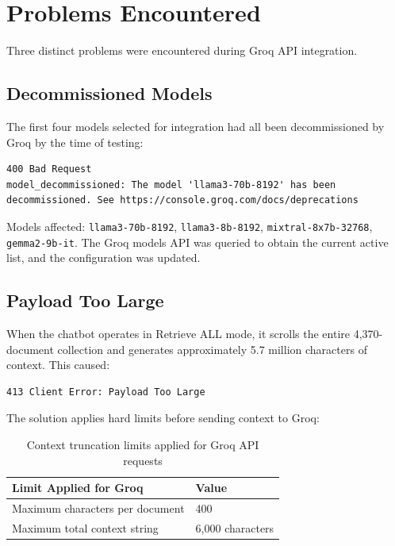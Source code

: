 \documentclass[12pt,a4paper]{report}
\begin{document}
\section{Problems Encountered}

Three distinct problems were encountered during Groq API integration.

\subsection{Decommissioned Models}

The first four models selected for integration had all been decommissioned by Groq by the time of testing:

\begin{lstlisting}[style=bashstyle]
400 Bad Request
model_decommissioned: The model 'llama3-70b-8192' has been
decommissioned. See https://console.groq.com/docs/deprecations
\end{lstlisting}

Models affected: \texttt{llama3-70b-8192}, \texttt{llama3-8b-8192}, \texttt{mixtral-8x7b-32768}, \texttt{gemma2-9b-it}. The Groq models API was queried to obtain the current active list, and the configuration was updated.

\subsection{Payload Too Large}

When the chatbot operates in Retrieve ALL mode, it scrolls the entire 4,370-document collection and generates approximately 5.7 million characters of context. This caused:

\begin{lstlisting}[style=bashstyle]
413 Client Error: Payload Too Large
\end{lstlisting}

The solution applies hard limits before sending context to Groq:

\begin{table}[H]
\centering
\begin{tabular}{ll}
\toprule
\textbf{Limit Applied for Groq} & \textbf{Value} \\
\midrule
Maximum characters per document & 400 \\
Maximum total context string & 6,000 characters \\
\bottomrule
\end{tabular}
\caption{Context truncation limits applied for Groq API requests}
\end{table}
\end{document}
